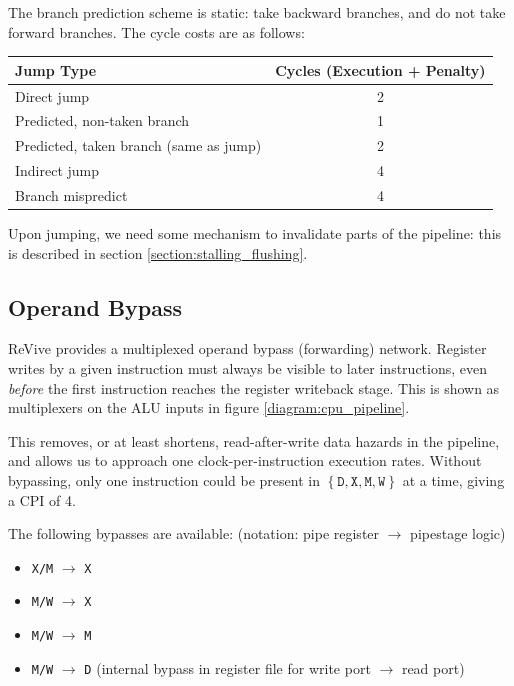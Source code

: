 \documentclass{article}
\begin{document}
The branch prediction scheme is static: take backward branches, and do not take forward branches. The cycle costs are as follows:

\begin{center}
\begin{tabular}{l c}
\hline
Jump Type & Cycles (Execution + Penalty) \\
\hline
Direct jump & 2 \\
Predicted, non-taken branch & 1 \\
Predicted, taken branch (same as jump) & 2 \\
Indirect jump & 4 \\
Branch mispredict & 4 \\
\hline
\end{tabular}
\end{center}

Upon jumping, we need some mechanism to invalidate parts of the pipeline: this is described in section \ref{section:stalling_flushing}.

\subsection{Operand Bypass}

ReVive provides a multiplexed operand bypass (forwarding) network. Register writes by a given instruction must always be visible to later instructions, even \textit{before} the first instruction reaches the register writeback stage. This is shown as multiplexers on the ALU inputs in figure \ref{diagram:cpu_pipeline}.

This removes, or at least shortens, read-after-write data hazards in the pipeline, and allows us to approach one clock-per-instruction execution rates. Without bypassing, only one instruction could be present in $\left\{ \texttt{D}, \texttt{X}, \texttt{M}, \texttt{W} \right\}$ at a time, giving a CPI of 4.

The following bypasses are available: (notation: pipe register $\to$ pipestage logic)

\begin{itemize}
	\item \texttt{X/M} $\to$ \texttt{X}
	\item \texttt{M/W} $\to$ \texttt{X}
	\item \texttt{M/W} $\to$ \texttt{M}
	\item \texttt{M/W} $\to$ \texttt{D} (internal bypass in register file for write port $\to$ read port)
\end{itemize}
\end{document}
